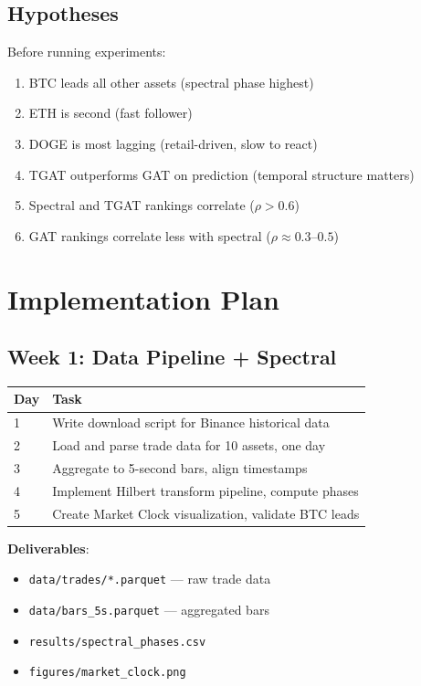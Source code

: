 \documentclass[11pt, a4paper]{article}
\begin{document}
\subsection{Hypotheses}

Before running experiments:

\begin{enumerate}
    \item BTC leads all other assets (spectral phase highest)
    \item ETH is second (fast follower)
    \item DOGE is most lagging (retail-driven, slow to react)
    \item TGAT outperforms GAT on prediction (temporal structure matters)
    \item Spectral and TGAT rankings correlate ($\rho > 0.6$)
    \item GAT rankings correlate less with spectral ($\rho \approx 0.3$--$0.5$)
\end{enumerate}

\section{Implementation Plan}

\subsection{Week 1: Data Pipeline + Spectral}

\begin{center}
\begin{tabular}{lp{10cm}}
\toprule
\textbf{Day} & \textbf{Task} \\
\midrule
1 & Write download script for Binance historical data \\
2 & Load and parse trade data for 10 assets, one day \\
3 & Aggregate to 5-second bars, align timestamps \\
4 & Implement Hilbert transform pipeline, compute phases \\
5 & Create Market Clock visualization, validate BTC leads \\
\bottomrule
\end{tabular}
\end{center}

\textbf{Deliverables}:
\begin{itemize}
    \item \texttt{data/trades/*.parquet} --- raw trade data
    \item \texttt{data/bars\_5s.parquet} --- aggregated bars
    \item \texttt{results/spectral\_phases.csv}
    \item \texttt{figures/market\_clock.png}
\end{itemize}
\end{document}
